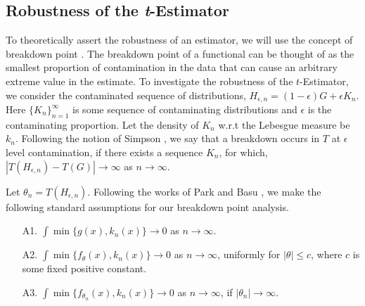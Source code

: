\documentclass{article}
\begin{document}
\subsection{Robustness of the \textit{t}-Estimator}
To theoretically assert the robustness of an estimator, we will use the concept of breakdown point  \citep{hampel1971general,donoho1983notion}. The breakdown point of a functional can be thought of as the smallest proportion of contamination in the data that can cause an arbitrary extreme value in the estimate. To investigate the robustness of the $t$-Estimator, we consider the contaminated sequence of distributions, $H_{\epsilon,n}=(1-\epsilon)G+\epsilon K_n.$
Here $\{K_n\}_{n=1}^\infty$ is some sequence of contaminating distributions and $\epsilon$ is the contaminating proportion. Let the density of $K_n$ w.r.t the Lebesgue measure be $k_n$. Following the notion of Simpson \citep{simpson1987minimum}, we say that a breakdown occurs in $T$ at $\epsilon$ level contamination, if there exists a sequence $K_n$, for which, $|T(H_{\epsilon,n})-T(G)|\to \infty$ as $n \to \infty$.\par
Let $\theta_n=T(H_{\epsilon,n})$. Following the works of Park and Basu \citep{park2004minimum}, we make the following standard assumptions for our breakdown point analysis.
\begin{itemize}
    \item[A1.] $\int \min\{g(x),k_n(x)\} \to 0 $ as $n \to \infty$. 
    \item[A2.] $ \int \min\{f_\theta(x),k_n(x)\} \to 0 $ as $n \to \infty$, uniformly for $|\theta| \leq c$, where $c$ is some fixed positive constant.
    \item[A3.] $ \int \min\{f_{\theta_n}(x),k_n(x)\} \to 0 $ as $n \to \infty$, if $|\theta_n| \to \infty$.
\end{itemize}
\end{document}
